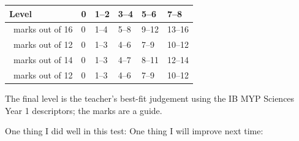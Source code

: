 \documentclass[12pt,a4paper]{article}
\begin{document}
\vspace{10pt}
\begin{center}
\begin{tabular}{|l|C{1.5cm}|C{1.5cm}|C{1.5cm}|C{1.5cm}|C{1.5cm}|}
\hline{}\textbf{Level} & 0 & 1–2 & 3–4 & 5–6 & 7–8\\\hline
{}\ marks out of 16 & 0 & 1–4 & 5–8 & 9–12 & 13–16\\\hline
{}\ marks out of 12 & 0 & 1–3 & 4–6 & 7–9 & 10–12\\\hline
{}\ marks out of 14 & 0 & 1–3 & 4–7 & 8–11 & 12–14\\\hline
{}\ marks out of 12 & 0 & 1–3 & 4–6 & 7–9 & 10–12\\\hline
\end{tabular}
\end{center}
{\small\color{muted}The final level is the teacher's best-fit judgement using the IB MYP Sciences Year 1 descriptors; the marks are a guide.}

\vspace{10pt}
One thing I did well in this test: 
One thing I will improve next time: 
\end{document}
